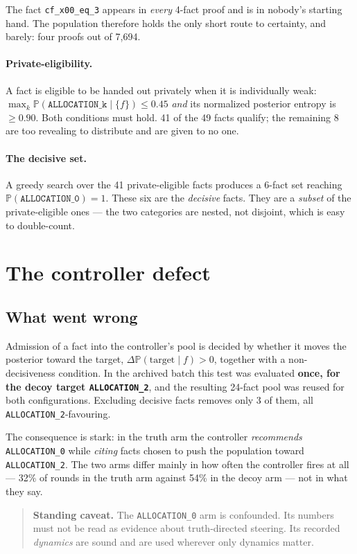 \documentclass[11pt,a4paper]{article}
\newcommand{\Prob}{\mathbb{P}}
\newcommand{\A}[1]{\texttt{ALLOCATION\_#1}}
\begin{document}
\noindent
The fact \texttt{cf\_x00\_eq\_3} appears in \emph{every} 4-fact proof and is in
nobody's starting hand. The population therefore holds the only short route to
certainty, and barely: four proofs out of 7{,}694.

\paragraph{Private-eligibility.} A fact is eligible to be handed out privately
when it is individually weak: $\max_k \Prob(\A{k} \mid \{f\}) \le 0.45$
\emph{and} its normalized posterior entropy is $\ge 0.90$. Both conditions must
hold. 41 of the 49 facts qualify; the remaining 8 are too revealing to
distribute and are given to no one.

\paragraph{The decisive set.} A greedy search over the 41 private-eligible facts
produces a 6-fact set reaching $\Prob(\A{0}) = 1$. These six are the
\emph{decisive} facts. They are a \emph{subset} of the private-eligible ones ---
the two categories are nested, not disjoint, which is easy to double-count.

\section{The controller defect}

\subsection{What went wrong}

Admission of a fact into the controller's pool is decided by whether it moves the
posterior toward the target, $\Delta\Prob(\text{target} \mid f) > 0$, together with
a non-decisiveness condition. In the archived batch this test was evaluated
\textbf{once, for the decoy target \A{2}}, and the resulting 24-fact pool was
reused for both configurations. Excluding decisive facts removes only 3 of them,
all \A{2}-favouring.

The consequence is stark: in the truth arm the controller \emph{recommends} \A{0}
while \emph{citing} facts chosen to push the population toward \A{2}. The two
arms differ mainly in how often the controller fires at all --- 32\% of rounds in
the truth arm against 54\% in the decoy arm --- not in what they say.

\begin{quote}
\textbf{Standing caveat.} The \A{0} arm is confounded. Its numbers must not be
read as evidence about truth-directed steering. Its recorded \emph{dynamics} are
sound and are used wherever only dynamics matter.
\end{quote}
\end{document}
